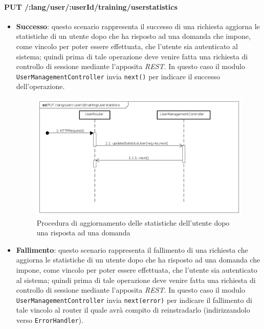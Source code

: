 \paragraph{PUT /:lang/user/:userId/training/userstatistics} %
\begin{itemize}
\item \textbf{Successo}: questo scenario rappresenta il successo di una richiesta aggiorna le statistiche di un utente dopo che ha risposto ad una domanda che impone, come vincolo per poter essere effettuata, che l'utente sia autenticato al sistema; quindi prima di tale operazione deve venire fatta una richiesta di controllo di sessione mediante l'apposita \textit{REST}. In questo caso il modulo \texttt{UserManagementController} invia \texttt{next()} per indicare il successo dell'operazione.

\begin{figure}[ht]
	\centering
	\includegraphics[scale=0.45]{UML/DiagrammiDiSequenza/Back-end/PUT__lang_user__userId_training_userstatistics_success.png}
	\caption{Procedura di aggiornamento delle statistiche dell'utente dopo una risposta ad una domanda}
\end{figure}
\FloatBarrier

\item \textbf{Fallimento}: questo scenario rappresenta il fallimento di una richiesta che aggiorna le statistiche di un utente dopo che ha risposto ad una domanda che impone, come vincolo per poter essere effettuata, che l'utente sia autenticato al sistema; quindi prima di tale operazione deve venire fatta una richiesta di controllo di sessione mediante l'apposita \textit{REST}. In questo caso il modulo \texttt{UserManagementController} invia \texttt{next(error)} per indicare il fallimento di tale vincolo al router il quale avrà compito di reinstradarlo (indirizzandolo verso \texttt{ErrorHandler}).


\end{itemize}
